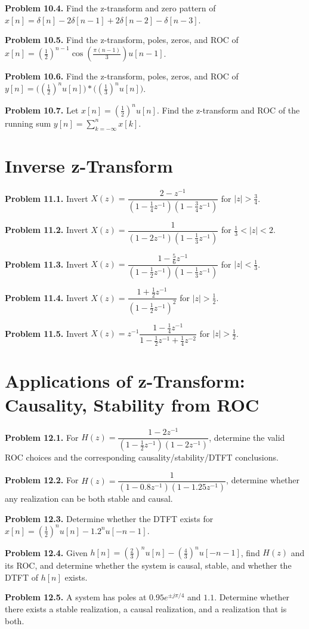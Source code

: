 \documentclass[10pt]{article}
\newcommand{\QuestionItem}[2]{\par\medskip\textbf{#1.} #2\par}
\begin{document}
\QuestionItem{Problem 10.4}{Find the z-transform and zero pattern of \(x[n]=\delta[n]-2\delta[n-1]+2\delta[n-2]-\delta[n-3]\).}

\QuestionItem{Problem 10.5}{Find the z-transform, poles, zeros, and ROC of \(x[n]=\left(\frac12\right)^{n-1}\cos\!\left(\frac{\pi(n-1)}{3}\right)u[n-1]\).}

\QuestionItem{Problem 10.6}{Find the z-transform, poles, zeros, and ROC of \(y[n]=\bigl(\left(\frac12\right)^n u[n]\bigr)*\bigl(\left(\frac13\right)^n u[n]\bigr)\).}

\QuestionItem{Problem 10.7}{Let \(x[n]=\left(\frac12\right)^n u[n]\). Find the z-transform and ROC of the running sum \(y[n]=\displaystyle\sum_{k=-\infty}^{n}x[k]\).}

\section{Inverse z-Transform}

\QuestionItem{Problem 11.1}{Invert \(X(z)=\dfrac{2-z^{-1}}{(1-\frac14 z^{-1})(1-\frac34 z^{-1})}\) for \(|z|>\frac34\).}

\QuestionItem{Problem 11.2}{Invert \(X(z)=\dfrac{1}{(1-2z^{-1})(1-\frac13 z^{-1})}\) for \(\frac13<|z|<2\).}

\QuestionItem{Problem 11.3}{Invert \(X(z)=\dfrac{1-\frac56 z^{-1}}{(1-\frac12 z^{-1})(1-\frac13 z^{-1})}\) for \(|z|<\frac13\).}

\QuestionItem{Problem 11.4}{Invert \(X(z)=\dfrac{1+\frac12 z^{-1}}{\left(1-\frac12 z^{-1}\right)^2}\) for \(|z|>\frac12\).}

\QuestionItem{Problem 11.5}{Invert \(X(z)=z^{-1}\dfrac{1-\frac14 z^{-1}}{1-\frac12 z^{-1}+\frac14 z^{-2}}\) for \(|z|>\frac12\).}

\section{Applications of z-Transform: Causality, Stability from ROC}

\QuestionItem{Problem 12.1}{For \(H(z)=\dfrac{1-2z^{-1}}{(1-\frac12 z^{-1})(1-2z^{-1})}\), determine the valid ROC choices and the corresponding causality/stability/DTFT conclusions.}

\QuestionItem{Problem 12.2}{For \(H(z)=\dfrac{1}{(1-0.8 z^{-1})(1-1.25 z^{-1})}\), determine whether any realization can be both stable and causal.}

\QuestionItem{Problem 12.3}{Determine whether the DTFT exists for \(x[n]=\left(\frac12\right)^n u[n]-1.2^n u[-n-1]\).}

\QuestionItem{Problem 12.4}{Given \(h[n]=\left(\frac23\right)^n u[n]-\left(\frac43\right)^n u[-n-1]\), find \(H(z)\) and its ROC, and determine whether the system is causal, stable, and whether the DTFT of \(h[n]\) exists.}

\QuestionItem{Problem 12.5}{A system has poles at \(0.95e^{\pm j\pi/4}\) and \(1.1\). Determine whether there exists a stable realization, a causal realization, and a realization that is both.}
\end{document}
